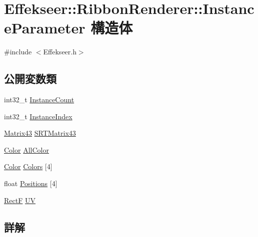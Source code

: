 \hypertarget{struct_effekseer_1_1_ribbon_renderer_1_1_instance_parameter}{}\section{Effekseer\+:\+:Ribbon\+Renderer\+:\+:Instance\+Parameter 構造体}
\label{struct_effekseer_1_1_ribbon_renderer_1_1_instance_parameter}


{\ttfamily \#include $<$Effekseer.\+h$>$}

\subsection*{公開変数類}
\begin{DoxyCompactItemize}
\item 
int32\+\_\+t \mbox{\hyperlink{struct_effekseer_1_1_ribbon_renderer_1_1_instance_parameter_a2af6b88f0a8ed75b33fed94f38934353}{Instance\+Count}}
\item 
int32\+\_\+t \mbox{\hyperlink{struct_effekseer_1_1_ribbon_renderer_1_1_instance_parameter_a39fb064c24fef06eee1c4deaad15e027}{Instance\+Index}}
\item 
\mbox{\hyperlink{struct_effekseer_1_1_matrix43}{Matrix43}} \mbox{\hyperlink{struct_effekseer_1_1_ribbon_renderer_1_1_instance_parameter_afc0524469889f23dec49ef302aa44c2b}{S\+R\+T\+Matrix43}}
\item 
\mbox{\hyperlink{struct_effekseer_1_1_color}{Color}} \mbox{\hyperlink{struct_effekseer_1_1_ribbon_renderer_1_1_instance_parameter_a87e802bfc8b166a32fef0b4971807a41}{All\+Color}}
\item 
\mbox{\hyperlink{struct_effekseer_1_1_color}{Color}} \mbox{\hyperlink{struct_effekseer_1_1_ribbon_renderer_1_1_instance_parameter_a4af0c70d517d18d09821b4dc04debbe5}{Colors}} \mbox{[}4\mbox{]}
\item 
float \mbox{\hyperlink{struct_effekseer_1_1_ribbon_renderer_1_1_instance_parameter_a1afec647ad8491d42678acc2e826c93a}{Positions}} \mbox{[}4\mbox{]}
\item 
\mbox{\hyperlink{struct_effekseer_1_1_rect_f}{RectF}} \mbox{\hyperlink{struct_effekseer_1_1_ribbon_renderer_1_1_instance_parameter_ae15daebe5ddca6f33083976153344531}{UV}}
\end{DoxyCompactItemize}


\subsection{詳解}


